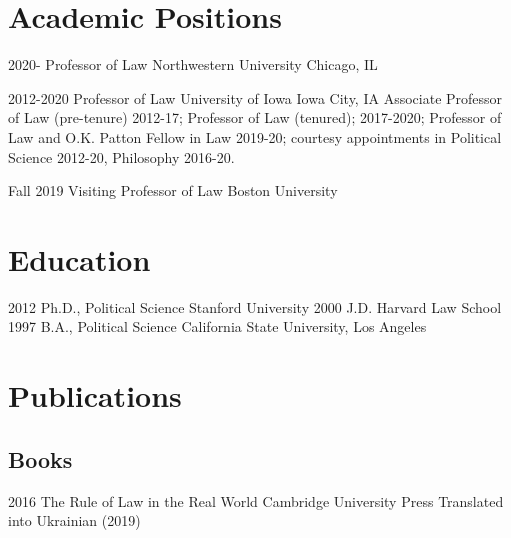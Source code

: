 \documentclass[letterpaper]{moderncv}
\begin{document}
\makecvtitle

\lfoot{\thepage}

%
%
\section{Academic Positions}
\cventry
{2020-}
{Professor of Law}
{Northwestern University}
{Chicago, IL}
{}
{}

\cventry
{2012-2020}
{Professor of Law}
{University of Iowa}
{Iowa City, IA}
{}
{Associate Professor of Law (pre-tenure) 2012-17; Professor of Law (tenured); 2017-2020; Professor of Law and O.K. Patton Fellow in Law 2019-20; courtesy appointments in Political Science 2012-20, Philosophy 2016-20.}
%

\cventry
{Fall 2019}
{Visiting Professor of Law}
{Boston University}
{}
{}
{}


%
%
\section{Education}
\cventry
{2012}
{Ph.D., Political Science}
{Stanford University}
{}
{}
{}
\cventry
{2000}
{J.D.}
{Harvard Law School}
{}
{}
{}
\cventry
{1997}
{B.A., Political Science}
{California State University, Los Angeles}
{}
{}
{}
%
%
\section{Publications}
\subsection{Books}
\cventry
{2016}
{The Rule of Law in the Real World}
{}
{Cambridge University Press}
{}
{Translated into Ukrainian (2019)}
\vspace{1mm}
\vspace{1mm}
\end{document}
